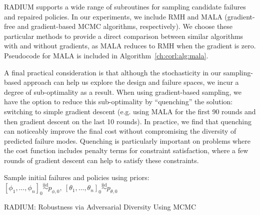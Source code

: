 RADIUM supports a wide range of subroutines for sampling candidate failures and repaired policies. In our experiments, we include RMH and MALA (gradient-free and gradient-based MCMC algorithms, respectively). We choose these particular methods to provide a direct comparison between similar algorithms with and without gradients, as MALA reduces to RMH when the gradient is zero. Pseudocode for MALA is included in Algorithm~\ref{ch:corl:alg:mala}.

A final practical consideration is that although the stochasticity in our sampling-based approach can help us explore the design and failure spaces, we incur a degree of sub-optimality as a result. When using gradient-based sampling, we have the option to reduce this sub-optimality by ``quenching'' the solution: switching to simple gradient descent (e.g. using MALA for the first 90 rounds and then gradient descent on the last 10 rounds). In practice, we find that quenching can noticeably improve the final cost without compromising the diversity of predicted failure modes. Quenching is particularly important on problems where the cost function includes penalty terms for constraint satisfaction, where a few rounds of gradient descent can help to satisfy these constraints.

\begin{algorithm}
    \SetAlgoLined

    Sample initial failures and policies using priors: $[\phi_1, \ldots, \phi_n]_0 \overset{\mathrm{iid}}{\sim} p_{\phi, 0},\ [\theta_1, \ldots, \theta_n]_0 \overset{\mathrm{iid}}{\sim} p_{\theta, 0}$\;



    \caption{RADIUM: Robustness via Adversarial Diversity Using MCMC}\label{ch:corl:alg:adv_diffusion}
\end{algorithm}


